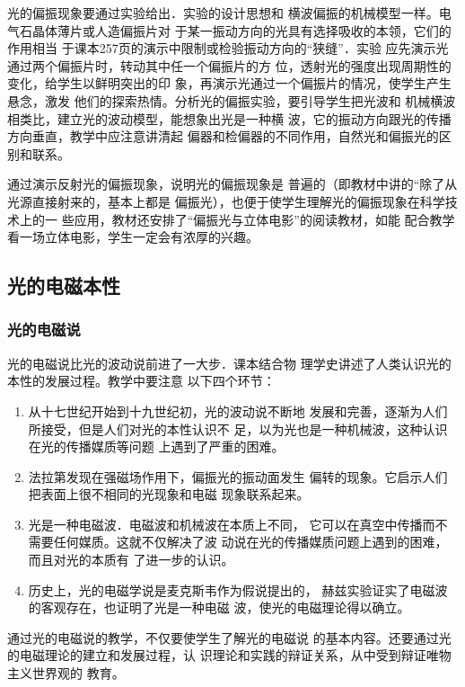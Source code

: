 光的偏振现象要通过实验给出．实验的设计思想和
横波偏振的机械模型一样。电气石晶体薄片或人造偏振片对
于某一振动方向的光具有选择吸收的本领，它们的作用相当
于课本257页的演示中限制或检验振动方向的“狭缝”．实验
应先演示光通过两个偏振片时，转动其中任一个偏振片的方
位，透射光的强度出现周期性的变化，给学生以鲜明突出的印
象，再演示光通过一个偏振片的情况，使学生产生悬念，激发
他们的探索热情。分析光的偏振实验，要引导学生把光波和
机械横波相类比，建立光的波动模型，能想象出光是一种横
波，它的振动方向跟光的传播方向垂直，教学中应注意讲清起
偏器和检偏器的不同作用，自然光和偏振光的区别和联系。

通过演示反射光的偏振现象，说明光的偏振现象是
普遍的（即教材中讲的“除了从光源直接射来的，基本上都是
偏振光），也便于使学生理解光的偏振现象在科学技术上的一
些应用，教材还安排了“偏振光与立体电影”的阅读教材，如能
配合教学看一场立体电影，学生一定会有浓厚的兴趣。

\subsection{光的电磁本性}

\subsubsection{光的电磁说}

光的电磁说比光的波动说前进了一大步．课本结合物
理学史讲述了人类认识光的本性的发展过程。教学中要注意
以下四个环节：
\begin{enumerate}
    \item 从十七世纪开始到十九世纪初，光的波动说不断地
发展和完善，逐渐为人们所接受，但是人们对光的本性认识不
足，以为光也是一种机械波，这种认识在光的传播媒质等问题
上遇到了严重的困难。
\item 法拉第发现在强磁场作用下，偏振光的振动面发生
偏转的现象。它启示人们把表面上很不相同的光现象和电磁
现象联系起来。
\item 光是一种电磁波．电磁波和机械波在本质上不同，
它可以在真空中传播而不需要任何媒质。这就不仅解决了波
动说在光的传播媒质问题上遇到的困难，而且对光的本质有
了进一步的认识。
\item 历史上，光的电磁学说是麦克斯韦作为假说提出的，
赫兹实验证实了电磁波的客观存在，也证明了光是一种电磁
波，使光的电磁理论得以确立。
\end{enumerate}

通过光的电磁说的教学，不仅要使学生了解光的电磁说
的基本内容。还要通过光的电磁理论的建立和发展过程，认
识理论和实践的辩证关系，从中受到辩证唯物主义世界观的
教育。

